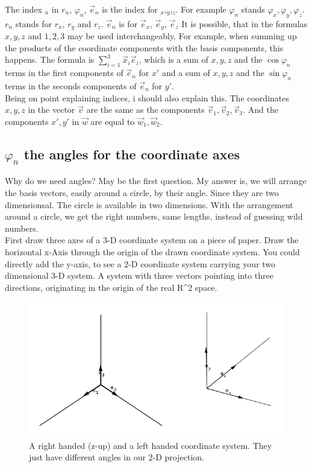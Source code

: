 \documentclass[a4paper]{article}
\begin{document}
The index $_{n}$ in $r_{n}$, $\varphi_{n}$, $\vec{e}_{n}$ is the index for $_x$,$_y$,$_z$. For example $\varphi_{n}$  stands $\varphi_x, \varphi_y, \varphi_z$. $r_{n}$ stands for $r_x$, $r_y$ and $r_z$. $\vec{e}_{n}$ is for $\vec{e}_x$, $\vec{e}_y$, $\vec{e}_z$ It is possible, that in the formulas $x,y,z$ and $1,2,3$ may be used interchangeably. For example, when summing up the products of the coordinate components with the basis components, this happens. The formula is $\sum_{i=1}^{3}\vec{x}_{i}\vec{e}_{i}$, which is a sum of $x,y,z$ and the $\cos \varphi_{n}$ terms in the first components of $\vec{e}_{n}$ for $x'$ and a sum of $x,y,z$ and the $\sin \varphi_{n}$ terms in the seconds components of $\vec{e}_{n}$ for $y'$.\\

Being on point explaining indices, i should also explain this. The coordinates $x,y,z$ in the vector $\vec{v}$ are the same as the components $\vec{v}_{1},\vec{v}_{2},\vec{v}_{3}$. And the components $x', y'$ in $\vec{w}$ are equal to $\vec{w}_{1}, \vec{w}_{2}$.\\

\subsection{$\varphi_{n}$ the angles for the coordinate axes}

Why do we need angles? May be the first question. My answer is, we will arrange the basis vectors,
easily around a circle, by their angle. Since they are two dimensionsal. The circle is available in two dimensions.
With the arrangement around a circle, we get the right numbers, same lengths, instead of guessing wild numbers.\\

First draw three axes of a 3-D coordinate system on a piece of paper. Draw the horizontal x-Axis through the origin of the drawn coordinate system. You could directly add the y-axis, to see a 2-D coordinate system carrying your two dimensional 3-D system. A system with three vectors pointing into three directions, originating in the origin of the real R^2 space.\\

\begin{figure}[ht]
\label{handsystems}
\includegraphics{handsystems.png}
\caption{A right handed (z-up) and a left handed coordinate system. They just have different angles in our 2-D projection.}
\end{figure}
\end{document}
